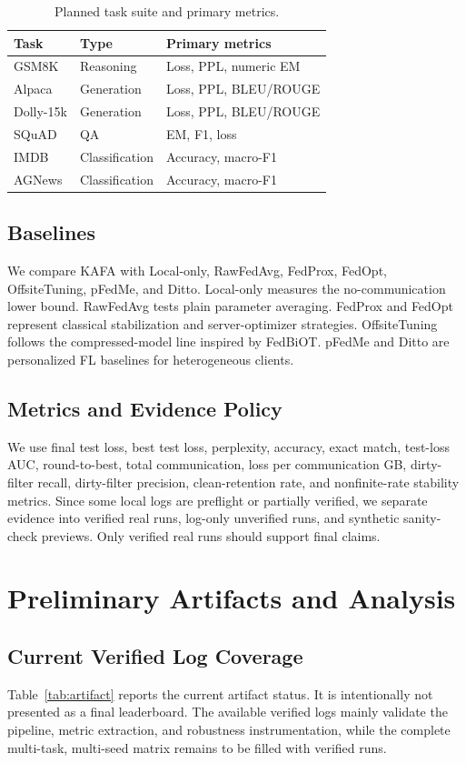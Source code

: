 \documentclass[conference]{IEEEtran}
\begin{document}
\begin{table}[t]
\caption{Planned task suite and primary metrics.}
\label{tab:datasets}
\centering
\small
\begin{tabular}{lll}
\toprule
Task & Type & Primary metrics \\
\midrule
GSM8K & Reasoning & Loss, PPL, numeric EM \\
Alpaca & Generation & Loss, PPL, BLEU/ROUGE \\
Dolly-15k & Generation & Loss, PPL, BLEU/ROUGE \\
SQuAD & QA & EM, F1, loss \\
IMDB & Classification & Accuracy, macro-F1 \\
AGNews & Classification & Accuracy, macro-F1 \\
\bottomrule
\end{tabular}
\end{table}

\subsection{Baselines}
We compare KAFA with Local-only, RawFedAvg, FedProx, FedOpt, OffsiteTuning, pFedMe, and Ditto. Local-only measures the no-communication lower bound. RawFedAvg tests plain parameter averaging. FedProx and FedOpt represent classical stabilization and server-optimizer strategies. OffsiteTuning follows the compressed-model line inspired by FedBiOT. pFedMe and Ditto are personalized FL baselines for heterogeneous clients.

\subsection{Metrics and Evidence Policy}
We use final test loss, best test loss, perplexity, accuracy, exact match, test-loss AUC, round-to-best, total communication, loss per communication GB, dirty-filter recall, dirty-filter precision, clean-retention rate, and nonfinite-rate stability metrics. Since some local logs are preflight or partially verified, we separate evidence into verified real runs, log-only unverified runs, and synthetic sanity-check previews. Only verified real runs should support final claims.

\section{Preliminary Artifacts and Analysis}
\subsection{Current Verified Log Coverage}
Table~\ref{tab:artifact} reports the current artifact status. It is intentionally not presented as a final leaderboard. The available verified logs mainly validate the pipeline, metric extraction, and robustness instrumentation, while the complete multi-task, multi-seed matrix remains to be filled with verified runs.
\end{document}
